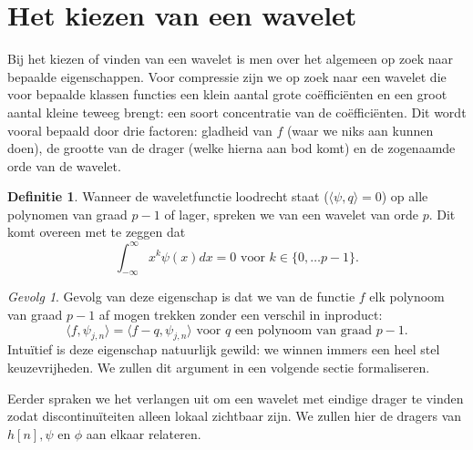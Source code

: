 \documentclass[11pt]{report}
\theoremstyle{plain}
\theoremstyle{definition}
\newtheorem{definitie}{Definitie}
\theoremstyle{remark}
\newtheorem*{gevolg}{Gevolg}
\begin{document}
\section{Het kiezen van een wavelet}
Bij het kiezen of vinden van een wavelet is men over het algemeen op zoek naar bepaalde eigenschappen. Voor compressie zijn we op zoek naar een wavelet die voor bepaalde klassen functies een klein aantal grote co\"effici\"enten en een groot aantal kleine teweeg brengt: een soort concentratie van de co\"effici\"enten. Dit wordt vooral bepaald door drie factoren: gladheid van $f$ (waar we niks aan kunnen doen), de grootte van de drager (welke hierna aan bod komt) en de zogenaamde orde van de wavelet.

\begin{definitie}
Wanneer de waveletfunctie loodrecht staat ($\langle \psi, q\rangle = 0$) op alle polynomen van graad $p-1$ of lager, spreken we van een wavelet van orde $p$. Dit komt overeen met te zeggen dat
\[
	\int_{-\infty}^\infty x^k \psi(x) dx = 0 \text{ voor } k \in \{ 0, \ldots p-1 \}.
\]
\end{definitie}

\begin{gevolg}
Gevolg van deze eigenschap is dat we van de functie $f$ elk polynoom van graad $p-1$ af mogen trekken zonder een verschil in inproduct:
\[
	\langle f, \psi_{j,n} \rangle = \langle f - q, \psi_{j,n} \rangle \text{ voor $q$ een polynoom van graad $p-1$}. 
\]
Intu\"itief is deze eigenschap natuurlijk gewild: we winnen immers een heel stel keuzevrijheden. We zullen dit argument in een volgende sectie formaliseren.
\end{gevolg}

Eerder spraken we het verlangen uit om een wavelet met eindige drager te vinden zodat discontinu\"iteiten alleen lokaal zichtbaar zijn. We zullen hier de dragers van $h[n], \psi$ en $\phi$ aan elkaar relateren.
\end{document}
